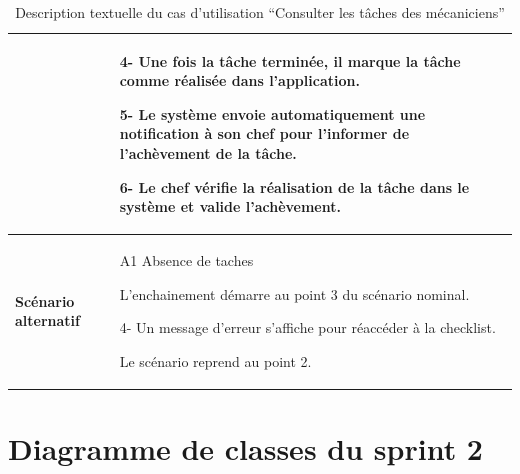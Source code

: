 \begin{table}[htbp]
  \centering
  \renewcommand{\arraystretch}{1.7} %
  \begin{tabular}{|p{4cm}|p{9cm}|}

                                 & 4- Une fois la tâche terminée, il marque la tâche comme réalisée dans l'application.\newline

    5- Le système envoie automatiquement une notification à son chef pour l'informer de l'achèvement de la tâche.\newline

    6- Le chef vérifie la réalisation de la tâche dans le système et valide l'achèvement.                                       \\


    \hline
    \textbf{Scénario alternatif} & A1 Absence de taches \newline

    L'enchainement démarre au point 3 du scénario nominal.\newline

    4- Un message d'erreur s'affiche pour réaccéder à la checklist. \newline

    Le scénario reprend au point 2.                                                                                             \\                                                                                           

    \hline
  \end{tabular}
  \caption{Description textuelle du cas d’utilisation “Consulter les tâches des mécaniciens”}

\end{table}




\newpage
\section{Diagramme de classes du sprint 2}


